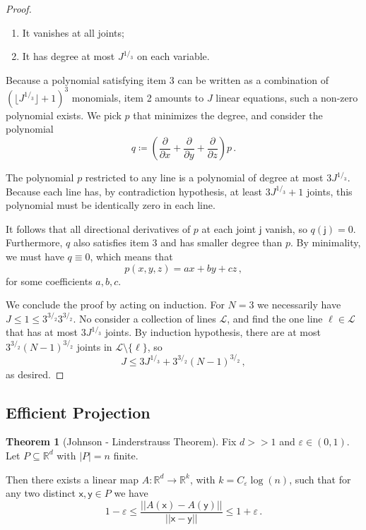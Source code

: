 \documentclass[12pt]{amsart}
\theoremstyle{definition}
\newtheorem{thm}{Theorem}[section]
\newcommand{\R}{\mathbb{R}}
\newcommand{\vj}{\mathsf{j}}
\newcommand{\vx}{\mathsf{x}}
\newcommand{\vy}{\mathsf{y}}
\begin{document}
\begin{proof}
\begin{enumerate}
\item It vanishes at all joints;

\item It has degree at most $J^{1/_3}$ on each variable.
\end{enumerate}

Because a polynomial satisfying item 3 can be written as a combination of $(\lfloor J^{1/_3}\rfloor + 1)^3$ monomials, item 2 amounts to $J$ linear equations, such a non-zero polynomial exists.
We pick $p$ that minimizes the degree, and consider the polynomial
$$q \coloneqq \left(\frac{\partial}{\partial x} + \frac{\partial}{\partial y} + \frac{\partial}{\partial z} \right) p \, .$$

The polynomial $p$ restricted to any line is a polynomial of degree at most $3J^{1/_3}$.
Because each line has, by contradiction hypothesis, at least $3 J^{1/_3} + 1$ joints, this polynomial must be identically zero in each line.

It follows that all directional derivatives of $p$ at each joint $\vj$ vanish, so $q(\vj) = 0$.
Furthermore, $q$ also satisfies item 3 and has smaller degree than $p$.
By minimality, we must have $q \equiv 0$, which means that 
$$ p(x, y, z ) = ax +by + cz \, ,$$
for some coefficients $a, b, c$.


We conclude the proof by acting on induction. For $N = 3$ we necessarily have $J\leq 1 \leq 3^{3/_2} 3^{3/_2}$.
No consider a collection of lines $\mathcal L$, and find the one line $\ell \in \mathcal L$ that has at most $3 J^{1/_3}$ joints.
By induction hypothesis, there are at most $3^{3/_2} (N-1)^{3/_2}$ joints in $\mathcal L \setminus \{\ell \}$, so 
$$ J \leq 3 J^{1/_3} + 3^{3/_2} (N-1)^{3/_2}\, , $$
as desired.
\end{proof}


\subsection{Efficient Projection}




\begin{thm}[Johnson - Linderstrauss Theorem]\label{thm:JL}
Fix $d >> 1$ and $\varepsilon \in (0, 1)$.
Let $P \subseteq \R^d$ with $|P| = n$ finite.

Then there exists a linear map $A:\R^d \to \R^k$, with $k = C_{\varepsilon} \log (n)$, such that for any two distinct $\vx, \vy \in P$ we have
$$ 1 - \varepsilon \leq \frac{||A(\vx) - A(\vy)||}{||\vx - \vy||} \leq 1 + \varepsilon \, . $$
\end{thm}
\end{document}
